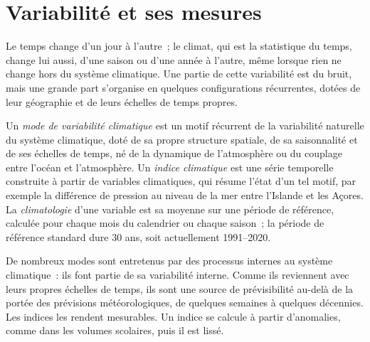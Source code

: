 \section{Variabilité et ses mesures}\label{sec:b2:climate-variability:measures}

Le temps change d'un jour à l'autre~; le climat, qui est la statistique du temps, change lui aussi,
d'une saison ou d'une année à l'autre, même lorsque rien ne change hors du système climatique.
Une partie de cette variabilité est du bruit, mais une grande part s'organise en quelques
configurations récurrentes, dotées de leur géographie et de leurs échelles de temps propres.

\begin{definition}\label{def:b2:climate-variability:modes}
Un \emph{mode de variabilité climatique} est un motif récurrent
de la variabilité naturelle du système climatique, doté de sa propre structure spatiale, de sa saisonnalité et de ses échelles de temps,
né de la dynamique de l'atmosphère ou du couplage entre l'océan et l'atmosphère.
Un \emph{indice climatique} est une série temporelle construite à partir de variables climatiques,
qui résume l'état d'un tel motif, par exemple la différence de pression au niveau de la mer entre l'Islande et les Açores.
La \emph{climatologie} d'une variable est sa moyenne sur une période de référence,
calculée pour chaque mois du calendrier ou chaque saison~; la période de référence standard dure 30 ans,
soit actuellement 1991--2020.
\end{definition}

De nombreux modes sont entretenus par des processus internes au système climatique~: ils font partie de sa
variabilité interne. Comme ils reviennent avec leurs propres échelles de temps, ils sont une source de
prévisibilité au-delà de la portée des prévisions météorologiques, de quelques semaines à quelques décennies. Les indices
les rendent mesurables. Un indice se calcule à partir d'anomalies, comme dans les volumes scolaires, puis il est
lissé.

